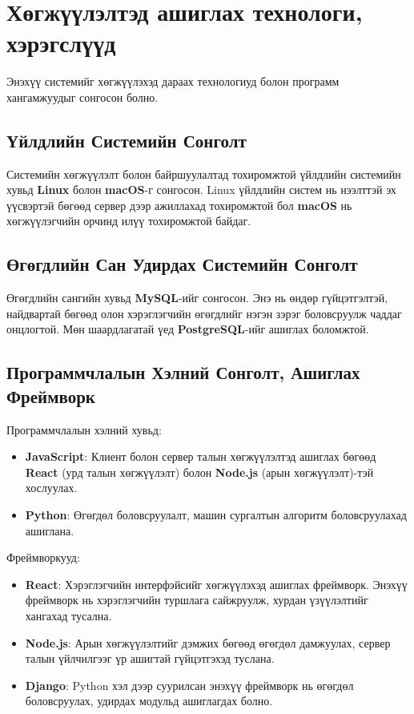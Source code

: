 \chapter{Хөгжүүлэлтэд ашиглах технологи, хэрэгслүүд}
\label{chapter2}

Энэхүү системийг хөгжүүлэхэд дараах технологиуд болон программ хангамжуудыг сонгосон болно.

\section{Үйлдлийн Системийн Сонголт}
Системийн хөгжүүлэлт болон байршуулалтад тохиромжтой үйлдлийн системийн хувьд \textbf{Linux} болон \textbf{macOS}-г сонгосон. Linux үйлдлийн систем нь нээлттэй эх үүсвэртэй бөгөөд сервер дээр ажиллахад тохиромжтой бол \textbf{macOS} нь хөгжүүлэгчийн орчинд илүү тохиромжтой байдаг.

\section{Өгөгдлийн Сан Удирдах Системийн Сонголт}
Өгөгдлийн сангийн хувьд \textbf{MySQL}-ийг сонгосон. Энэ нь өндөр гүйцэтгэлтэй, найдвартай бөгөөд олон хэрэглэгчийн өгөгдлийг нэгэн зэрэг боловсруулж чаддаг онцлогтой. Мөн шаардлагатай үед \textbf{PostgreSQL}-ийг ашиглах боломжтой.

\section{Программчлалын Хэлний Сонголт, Ашиглах Фреймворк}
Программчлалын хэлний хувьд:
\begin{itemize}
    \item \textbf{JavaScript}: Клиент болон сервер талын хөгжүүлэлтэд ашиглах бөгөөд \textbf{React} (урд талын хөгжүүлэлт) болон \textbf{Node.js} (арын хөгжүүлэлт)-тэй хослуулах.
    \item \textbf{Python}: Өгөгдөл боловсруулалт, машин сургалтын алгоритм боловсруулахад ашиглана.
\end{itemize}

Фреймворкууд:
\begin{itemize}
    \item \textbf{React}: Хэрэглэгчийн интерфэйсийг хөгжүүлэхэд ашиглах фреймворк. Энэхүү фреймворк нь хэрэглэгчийн туршлага сайжруулж, хурдан үзүүлэлтийг хангахад тусална.
    \item \textbf{Node.js}: Арын хөгжүүлэлтийг дэмжих бөгөөд өгөгдөл дамжуулах, сервер талын үйлчилгээг үр ашигтай гүйцэтгэхэд туслана.
    \item \textbf{Django}: Python хэл дээр суурилсан энэхүү фреймворк нь өгөгдөл боловсруулах, удирдах модульд ашиглагдах болно.
\end{itemize}

